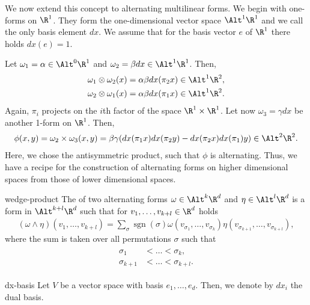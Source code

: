 \begin{intro}
  We now extend this concept to alternating multilinear forms. We
  begin with one-forms on $\R^1$. They form the one-dimensional vector
  space $\Alt^1\R^1$ and we call the only basis element $dx$. We
  assume that for the basis vector $e$ of $\R^1$ there holds $dx(e) = 1$.

  Let $\omega_1 = \alpha \in \Alt^0\R^1$ and
  $\omega_2 = \beta dx \in\Alt^1\R^1$. Then,
  \begin{gather}
    \begin{split}
          \omega_1\otimes\omega_2 (x) &= \alpha\beta dx(\pi_2x) \in\Alt^1\R^2,
          \\
          \omega_2\otimes\omega_1 (x) &= \alpha\beta dx(\pi_1x) \in\Alt^1\R^2.
    \end{split}
  \end{gather}
  Again, $\pi_i$ projects on the $i$th factor of the space
  $\R^1\times \R^1$. Let now $\omega_3 = \gamma dx$ be another 1-form
  on $\R^1$. Then,
  \begin{gather}
    \phi(x,y) = \omega_2\times \omega_3(x,y) = \beta\gamma (dx(\pi_1 x)
    dx(\pi_2 y) - dx(\pi_2 x) dx(\pi_1)y) \in \Alt^2\R^2.
  \end{gather}
  Here, we chose the antisymmetric product, such that $\phi$ is
  alternating. Thus, we have a recipe for the construction of
  alternating forms on higher dimensional spaces from those of lower
  dimensional spaces.
\end{intro}


\begin{Definition}{wedge-product}
  The  of two alternating forms
  $\omega\in \Alt^k\R^d$ and $\eta\in\Alt^l\R^d$ is a form in $\Alt^{k+l}\R^d$ such that for
  $v_1,\dots,v_{k+l}\in\R^d$ holds
  \begin{gather}
    (\omega\wedge\eta)(v_1,\dots,v_{k+l})
    = \sum_{\sigma} \operatorname{sgn}(\sigma) \omega(v_{\sigma_1},\dots,v_{\sigma_k})
    \eta(v_{\sigma_{k+1}},\dots,v_{\sigma_{k+l}}),
  \end{gather}
  where the sum is taken over all permutations $\sigma$ such that
  \begin{gather}
    \begin{split}
      \sigma_1 &< \dots < \sigma_k,\\
      \sigma_{k+1} & < \dots < \sigma_{k+l}.
    \end{split}
  \end{gather}
\end{Definition}

\begin{Notation}{dx-basis}
  Let $V$ be a vector space with basis $e_1,\dots,e_d$. Then, we denote by $dx_i$ the dual basis.
\end{Notation}
